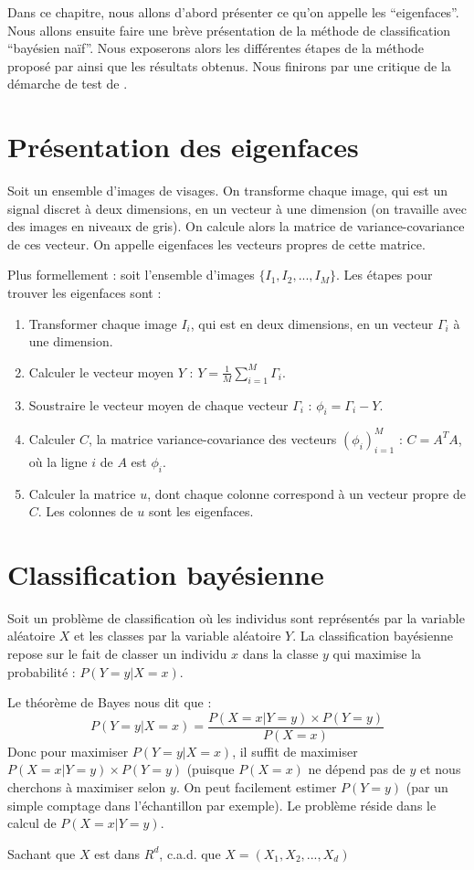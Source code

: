 Dans ce chapitre, nous allons d'abord présenter ce qu'on appelle les ``eigenfaces''.
Nous allons ensuite faire une brève présentation de la méthode de classification
``bayésien naïf''. Nous exposerons alors les différentes étapes de la méthode proposé
par \cite{article} ainsi que les résultats obtenus. Nous finirons par une critique de
la démarche de test de \cite{article}.

\section{Présentation des eigenfaces}
Soit un ensemble d'images de visages. On transforme chaque image, qui est un signal
discret à deux dimensions, en un vecteur à une dimension (on travaille avec des
images en niveaux de gris). On calcule alors la matrice de variance-covariance
de ces vecteur. On appelle eigenfaces les vecteurs propres de cette matrice.

Plus formellement : soit l'ensemble d'images $\{I_1, I_2, ..., I_M\}$.
Les étapes pour trouver les eigenfaces sont :
\begin{enumerate}
    \item Transformer chaque image $I_i$, qui est en deux dimensions,
    en un vecteur $\Gamma_i$ à une dimension.
    \item Calculer le vecteur moyen $Y$ : $Y = \frac{1}{M} \sum_{i=1}^M \Gamma_i$.
    \item Soustraire le vecteur moyen de chaque vecteur $\Gamma_i$ : $\phi_i = \Gamma_i - Y$.
    \item Calculer $C$, la matrice variance-covariance des vecteurs $(\phi_i)_{i=1}^M$ :
    $C = A^TA$, où la ligne $i$ de $A$ est $\phi_i$.
    \item Calculer la matrice $u$, dont chaque colonne correspond à un vecteur
    propre de $C$. Les colonnes de $u$ sont les eigenfaces.
\end{enumerate}

\section{Classification bayésienne}
Soit un problème de classification où les individus sont représentés
par la variable aléatoire $X$ et les classes par la variable aléatoire $Y$.
La classification bayésienne repose sur le fait de classer un individu $x$ dans la
classe $y$ qui maximise la probabilité : $P(Y=y|X=x)$.

Le théorème de Bayes nous dit que :
\[
    P(Y=y|X=x) = \frac{P(X=x|Y=y) \times P(Y=y)}{P(X=x)}
\]
Donc pour maximiser $P(Y=y|X=x)$, il suffit de maximiser $P(X=x|Y=y) \times P(Y=y)$
(puisque $P(X=x)$ ne dépend pas de $y$ et nous cherchons à maximiser selon $y$.
On peut facilement estimer $P(Y=y)$ (par un simple comptage dans l'échantillon par exemple).
Le problème réside dans le calcul de $P(X=x|Y=y)$.

Sachant que $X$ est dans $R^d$, c.a.d. que $X = (X_1, X_2, ..., X_d)$